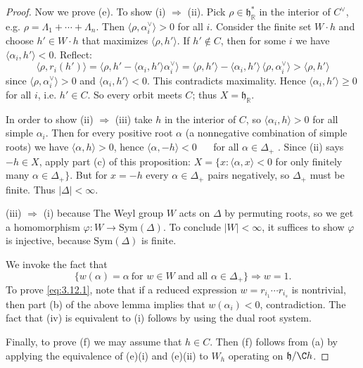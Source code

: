 \documentclass[12pt]{article}
\begin{document}
\begin{proof}
    Now we prove (e). To show (i) $\Rightarrow$ (ii). Pick $\rho\in \mathfrak{h}_{\mathbb{R}}^*$ in the interior of $C^\vee$, e.g. $\rho=\Lambda_1+\cdots+\Lambda_n$. Then
    $\langle \rho,\alpha_i^\vee\rangle>0$ for all $i$.
    Consider the finite set $W\cdot h$ and choose $h'\in W\cdot h$ that maximizes $\langle \rho, h' \rangle$.
    If $h'\notin C$, then for some $i$ we have $\langle \alpha_i,h'\rangle<0$. Reflect:
    \[
        \langle \rho, r_i(h')\rangle
        = \langle \rho, h' - \langle \alpha_i,h'\rangle \alpha_i^\vee\rangle
        = \langle \rho, h'\rangle - \langle \alpha_i,h'\rangle\,\langle \rho,\alpha_i^\vee\rangle
        > \langle \rho,h'\rangle
    \]
    since $\langle \rho,\alpha_i^\vee\rangle>0$ and $\langle \alpha_i,h'\rangle<0$. This contradicts maximality. Hence $\langle \alpha_i,h'\rangle\ge 0$ for all $i$, i.e. $h'\in C$. So every orbit meets $C$; thus $X=\mathfrak{h}_{\mathbb{R}}$.

    In order to show (ii) $\Rightarrow$ (iii) take $h$ in the interior of $C$, so $\langle \alpha_i,h\rangle>0$ for all simple $\alpha_i$. Then for every positive root $\alpha$ (a nonnegative combination of simple roots) we have $\langle \alpha, h\rangle>0$, hence
    $\langle \alpha,-h\rangle<0$ $\quad$ for all $\alpha\in\Delta_+$ .
    Since (ii) says $-h\in X$, apply part (c) of this proposition: $X=\{x : \langle \alpha,x\rangle<0$ for only finitely many $\alpha\in\Delta_+\}$. But for $x=-h$ every $\alpha\in\Delta_+$ pairs negatively, so $\Delta_+$ must be finite. Thus $|\Delta|<\infty$.

    (iii) $\Rightarrow$ (i) because The Weyl group $W$ acts on $\Delta$ by permuting roots, so we get a homomorphism $\varphi: W \longrightarrow \mathrm{Sym}(\Delta)$. To conclude $|W|<\infty$, it suffices to show $\varphi$ is injective, because $\mathrm{Sym}(\Delta)$ is finite.

    We invoke the fact that
    \begin{equation}\label{eq:3.12.1}
        \{ w(\alpha) = \alpha \ \text{for } w\in W \text{ and all } \alpha \in \Delta_+ \}
        \Rightarrow w=1.
    \end{equation}
    To prove \eqref{eq:3.12.1}, note that if a reduced expression $w=r_{i_1}\cdots r_{i_s}$
    is nontrivial, then part (b) of the above lemma implies that $w(\alpha_i)<0$, contradiction.
    The fact that (iv) is equivalent to (i) follows by using the dual root system.

    Finally, to prove (f) we may assume that $h \in C$. Then (f) follows from (a)
    by applying the equivalence of (e)(i) and (e)(ii) to $W_h$ operating on $\mathfrak{h}/\C h$.
\end{proof}
\end{document}
